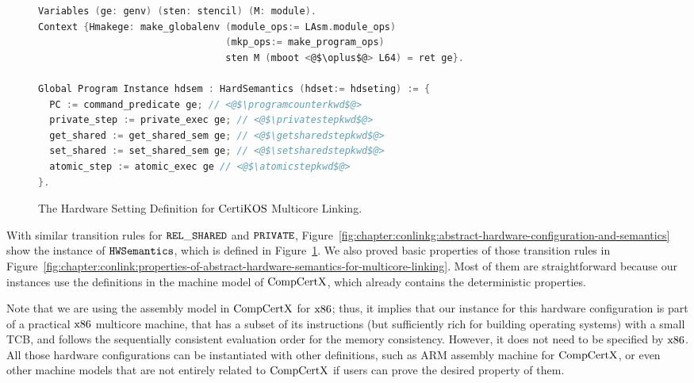 \begin{figure}
\begin{lstlisting}[language=C]
Variables (ge: genv) (sten: stencil) (M: module).
Context {Hmakege: make_globalenv (module_ops:= LAsm.module_ops) 
                                 (mkp_ops:= make_program_ops) 
                                 sten M (mboot <@$\oplus$@> L64) = ret ge}.

Global Program Instance hdsem : HardSemantics (hdset:= hdseting) := {
  PC := command_predicate ge; // <@$\programcounterkwd$@>
  private_step := private_exec ge; // <@$\privatestepkwd$@>
  get_shared := get_shared_sem ge; // <@$\getsharedstepkwd$@>
  set_shared := set_shared_sem ge; // <@$\setsharedstepkwd$@>
  atomic_step := atomic_exec ge // <@$\atomicstepkwd$@>
}.
\end{lstlisting}
\caption{The Hardware Setting Definition for $\mathrm{CertiKOS}$ Multicore Linking.}
\label{fig:chapter:certikos:hardware-local-step-transition-rules}
\end{figure}

With similar transition rules for ${{\mathrm{\texttt{REL}}}\_{\mathrm{\texttt{SHARED}}}}$ and ${{\mathrm{\texttt{PRIVATE}}}}$,
Figure~\ref{fig:chapter:conlinkg:abstract-hardware-configuration-and-semantics}
show the instance of ${\mathrm{\texttt{HWSemantics}}}$, which is defined in Figure~\ref{fig:chapter:certikos:hardware-local-step-transition-rules}. 
We also proved basic properties of those transition rules in Figure~\ref{fig:chapter:conlink:properties-of-abstract-hardware-semantics-for-multicore-linking}.
Most of them are straightforward because our instances use the definitions in the machine model of $\mathrm{CompCertX}$,
which already contains the deterministic properties. 

Note that we are using the assembly model  in $\mathrm{CompCertX}$ for $\mathrm{x86}$; thus, it implies that 
our instance for this hardware configuration is   part of a practical $\mathrm{x86}$ multicore machine,
that has a subset of its instructions (but sufficiently rich for building operating systems) with a small TCB, 
and follows the sequentially consistent evaluation order for the memory consistency. 
However, it does not need to be specified by $\mathrm{x86}$. 
All those hardware configurations can be instantiated with other definitions, such as ARM assembly machine for $\mathrm{CompCertX}$, 
or even other machine models that are not entirely related to $\mathrm{CompCertX}$ if users can prove the desired property of them.



